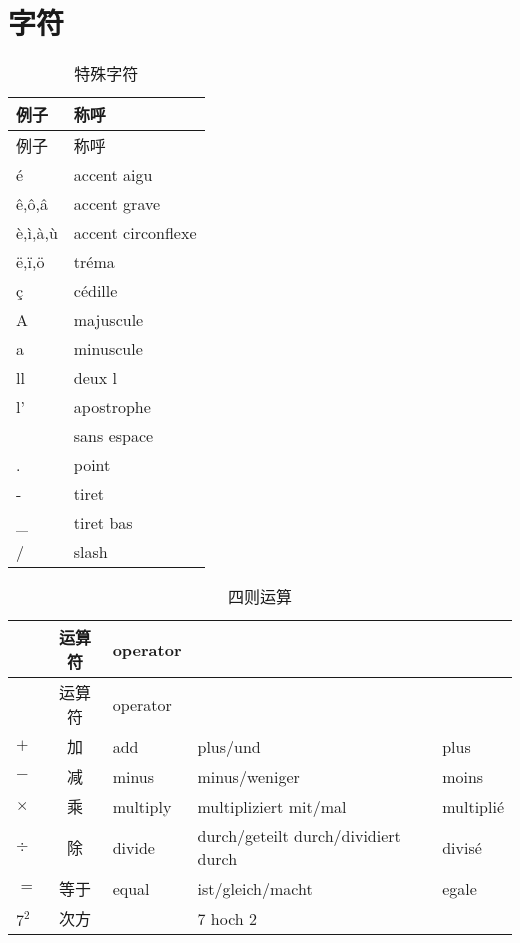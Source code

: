 \documentclass[12pt,A4paper,oneside,reqno]{amsart}
\numberwithin{equation}{section}
\theoremstyle{plain}
\theoremstyle{plain}
\theoremstyle{plain}
\numberwithin{equation}{section}
\theoremstyle{remark}
\begin{document}
\section{字符}
\begin{longtable}{|l|l|}
	\hline
	例子	&	称呼	\\							
	\hline
	\endhead
	\hline
	例子	&	称呼	\\													
	\hline
	\endfirsthead	
	\hline
	\endfoot
	\hline
	\caption{特殊字符}
	\endlastfoot				
	
\'{e}	&	accent aigu	\\
\^{e},\^{o},\^{a}	&	accent grave	\\
\`{e},\`{i},\`{a},\`{u}	&	accent circonflexe	\\
\"{e},\"{i},\"{o}	&	tr\'{e}ma	\\
\c{c}	&	c\'{e}dille	\\
\hline			
A	&	majuscule	\\
a	&	minuscule	\\
ll	&	deux l	\\
l'	&	apostrophe	\\
&	sans espace	\\
.	&	point	\\
-	&	tiret	\\
\_	&	tiret bas	\\
/	&	slash	\\

	
	
\end{longtable}
\begin{longtable}{l|c|l|l|l}
	\hline
	&	运算符	&	operator	&		&		\\
							
	\hline
	\endhead
	\hline
	&	运算符	&	operator	&		&		\\
												
	\hline
	\endfirsthead	
	\hline
	\endfoot
	\hline
	\caption{四则运算}
	\endlastfoot				
$+$	&	加	&	add	&	plus/und	&	plus	\\
$-$	&	减	&	minus	&	minus/weniger	&	moins	\\
$\times$	&	乘	&	multiply	&	multipliziert mit/mal	&	multipli\'{e}	\\
$\div$	&	除	&	divide	&	durch/geteilt durch/dividiert durch	&	divis\'{e}	\\
$=$	&	等于	&	equal	&	ist/gleich/macht	&	{e}gale	\\
$7^2$	&	次方	&		&	7 hoch 2	&		\\

	
	
	
	
\end{longtable}
\end{document}
